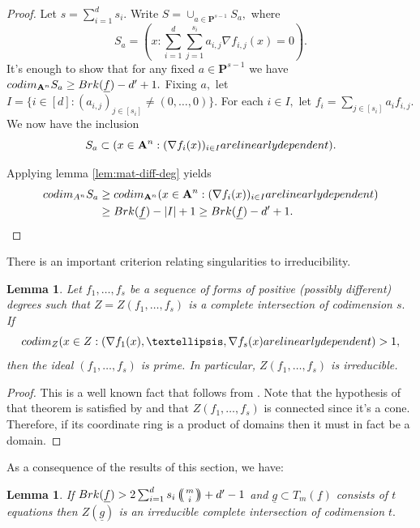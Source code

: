 \documentclass[10pt,a4paper]{amsart}
\let\ul\underline
\newtheorem{lemma}[theorem]{Lemma}
\theoremstyle{definition}
\def\multiset#1#2{\ensuremath{\left(\kern-.3em\left(\genfrac{}{}{0pt}{}{#1}{#2}\right)\kern-.3em\right)}}
\newcommand{\A}{\mathbf{A}}
\renewcommand{\P}{\mathbf{P}}
\newcommand{\codim}{\textnormal{codim}}
\newcommand{\brk}{\textnormal{Brk}}
\begin{document}
\begin{proof}
Let $s = \sum_{i=1}^d s_i.$ Write $S = \cup_{a\in \P^{s-1}} S_a,$ where 
\[
S_a =  \left(x: \sum_{i=1}^d\sum_{j=1}^{s_i} a_{i,j} \nabla f_{i,j}(x) = 0 \right).
\]
It's enough to show that for any fixed $a\in \P^{s-1}$ we have $\codim_{\A^n} S_a \ge \brk(\ul{f})-d'+1.$ Fixing $a,$ let $I = \{i\in [d]: (a_{i,j})_{j\in [s_i]} \neq (0,\ldots,0)\}.$ For each $i\in I,$ let $f_i = \sum_{j\in [s_i]} a_i f_{i,j}.$ We now have the inclusion 
\[
S_a \subset (x\in \A^n: (\nabla f_i(x))_{i\in I} \textnormal{ are linearly dependent}).
\]

Applying lemma \ref{lem:mat-diff-deg} yields
\begin{align*}
    \codim_{A^n} S_a &\ge \codim_{\A^n} (x\in \A^n: (\nabla f_i(x))_{i\in I} \textnormal{ are linearly dependent}) \\
    &\ge \brk(\ul{f}) - |I|+1 \ge \brk(\ul{f}) - d'+1. 
\end{align*}  
\end{proof}

There is an important criterion relating singularities to irreducibility.

\begin{lemma}\label{lem:R1-seq}
   Let $f_1,\ldots,f_s$ be a sequence of forms of positive (possibly different) degrees such that $ Z = Z(f_1,\ldots,f_s)$ is a complete intersection of codimension $s.$ If 
   \[
   \codim_Z (x\in Z: (\nabla f_1(x),\ldots,\nabla f_s(x) \textnormal{ are linearly dependent}) >1, 
   \]
   then the ideal $(f_1,\ldots,f_s)$ is prime. In particular, $Z(f_1,\ldots,f_s)$ is irreducible. 
\end{lemma}

\begin{proof}
    This is a well known fact that follows from \cite[Theorem 18.15b]{Eisenbud}. Note that the hypothesis of that theorem is satisfied by \cite[Proposition 18.13]{Eisenbud} and that $Z(f_1,\ldots,f_s)$ is connected since it's a cone. Therefore, if its coordinate ring is a product of domains then it must in fact be a domain.
\end{proof}

As a consequence of the results of this section, we have:

\begin{lemma}\label{lem:brk-irr}
    If $\brk(\ul{f}) > 2\sum_{i=1}^d s_i \multiset{m}{i}+d'-1$ and $\ul{g} \subset T_m(\ul{f})$ consists of $t$ equations then $Z(\ul{g})$ is an irreducible complete intersection of codimension $t.$
\end{lemma}
\end{document}
